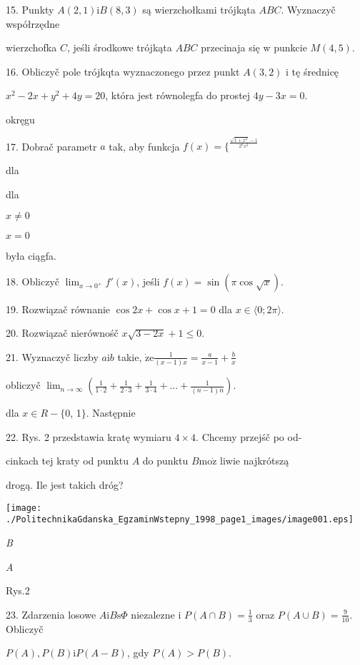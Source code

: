 \documentclass[a4paper,12pt]{article}
\begin{document}
15. Punkty $A(2,1) \mathrm{i} B(8,3)$ są wierzchołkami trójkąta $ABC$. Wyznaczyč współrzędne

wierzchofka $C$, jeśli środkowe trójkąta $ABC$ przecinaja się w punkcie $M(4,5).$

16. Obliczyč pole trójkqta wyznaczonego przez punkt $A(3,2)$ i tę średnicę

$x^{2}-2x+y^{2}+4y=20$, która jest równolegfa do prostej $4y-3x=0.$

okręgu

17. Dobrač parametr $a$ tak, aby funkcja $f(x)=\{^{\frac{\sqrt{1+x^{2}}-1}{2^{a}x^{2}}}$

dla

dla

$x\neq 0$

$x=0$

była ciągfa.

18. Obliczyč $\displaystyle \lim_{x\rightarrow 0^{+}}f'(x)$, jeśli $f(x)=\sin(\pi\cos\sqrt{x}).$

19. Rozwiązač równanie $\cos 2x+\cos x+1=0$ dla $x\in\langle 0;2\pi\rangle.$

20. Rozwiązač nierównośč $x\sqrt{3-2x}+1\leq 0.$

21. Wyznaczyč liczby $a\mathrm{i}b$ takie, $\dot{\mathrm{z}}\mathrm{e} \displaystyle \frac{1}{(x-1)x}=\frac{a}{x-1}+\frac{b}{x}$

obliczyč $\displaystyle \lim_{n\rightarrow\infty}(\frac{1}{1\cdot 2}+\frac{1}{2\cdot 3}+\frac{1}{3\cdot 4}+\ldots+\frac{1}{(n-1)n}).$

dla $x\in R-\{0$, 1$\}$. Następnie

22. Rys. 2 przedstawia kratę wymiaru $4\times 4$. Chcemy przejśč po od-

cinkach tej kraty od punktu $A$ do punktu $B\mathrm{m}\mathrm{o}\dot{\mathrm{z}}$ liwie najkrótszą

drogą. Ile jest takich dróg?
\begin{center}
\texttt{[image: ./PolitechnikaGdanska\_EgzaminWstepny\_1998\_page1\_images/image001.eps]}
\end{center}
{\it B}

{\it A}

Rys.2

23. Zdarzenia losowe $ A\mathrm{i}B\mathrm{s}\Phi$ niezalezne i $P(A\displaystyle \cap B)=\frac{1}{3}$ oraz $P(A\displaystyle \cup B)=\frac{9}{10}$. Obliczyč

$P(A), P(B)\mathrm{i}P(A-B)$, gdy $P(A)>P(B).$
\end{document}
